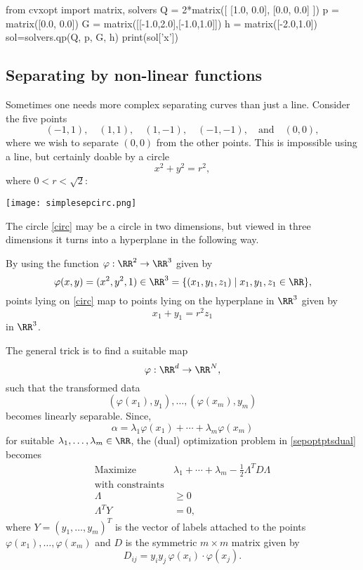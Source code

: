\documentclass{article}
\begin{document}
\begin{sage}
from cvxopt import matrix, solvers
Q = 2*matrix([ [1.0, 0.0], [0.0, 0.0] ])
p = matrix([0.0, 0.0])
G = matrix([[-1.0,2.0],[-1.0,1.0]])
h = matrix([-2.0,1.0])
sol=solvers.qp(Q, p, G, h)
print(sol['x'])
\end{sage}
\endshex

  \subsection{Separating by non-linear functions}

  Sometimes one needs more complex separating curves than just a line. 
  Consider the five points
  $$
  (-1, 1), \quad (1, 1), \quad (1, -1), \quad (-1, -1),\quad \text{and} \quad (0, 0),
  $$
  where we wish to separate $(0, 0)$ from the other points. This is impossible
  using a line, but certainly doable by a circle
  \begin{equation}\label{circ}
  x^2 + y^2 = r^2,
  \end{equation}
  where $0<r<\sqrt{2}$:


\texttt{[image: simplesepcirc.png]}

  The circle \eqref{circ} may be a circle in two
  dimensions, but viewed in three dimensions it turns into a
  hyperplane in the following way.

  By using the function $\varphi:\RR^2\rightarrow \RR^3$ given by
  $$
  \varphi(x, y) = (x^2, y^2, 1)\in \RR^3 = \{(x_1, y_1, z_1)\mid x_1, y_1, z_1\in \RR\},
  $$
  points lying on \eqref{circ} map to points lying on the
  hyperplane in $\RR^3$ given by
  $$
  x_1 + y_1 = r^2 z_1
  $$
  in $\RR^3$.
  
  
The general trick is to find a suitable map
$$
\varphi: \RR^d\rightarrow \RR^N,
$$
such that the transformed data
$$
  (\varphi(x_1), y_1), \dots, (\varphi(x_m), y_m)
  $$
  becomes linearly separable. 
  Since,
  $$
  \alpha = \lambda_1 \varphi(x_1) + \cdots + \lambda_m \varphi(x_m)
  $$
  for suitable $\lambda_1, \dots, \lambda_m\in \RR$, the (dual) optimization problem in  
\eqref{sepoptptsdual} becomes
    \begin{align*}
    \text{Maximize}\qquad\quad &\lambda_1 + \cdots + \lambda_m - \frac{1}{2} \Lambda^T D \Lambda\\
     \text{with constraints}&\\
    \Lambda &\geq 0\\
    \Lambda^T Y &= 0,
    \end{align*}
    where $Y =(y_1, \dots, y_m)^T$ is the vector of labels attached to
    the points $\varphi(x_1), \dots, \varphi(x_m)$ and $D$ is the symmetric $m\times m$
    matrix given by
    \begin{equation}\label{dmatrix}
    D_{ij} = y_i y_j\, \varphi(x_i)\cdot \varphi(x_j).
    \end{equation}
\end{document}
